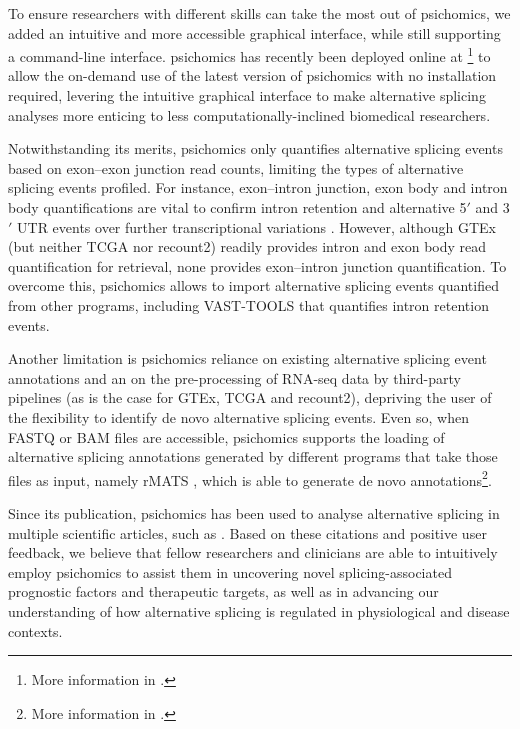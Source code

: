 To ensure researchers with different skills can take the most out of psichomics, we added an intuitive and more accessible graphical interface, while still supporting a command-line interface. psichomics has recently been deployed online at \footnote{More information in .} to allow the on-demand use of the latest version of psichomics with no installation required, levering the intuitive graphical interface to make alternative splicing analyses more enticing to less computationally-inclined biomedical researchers.

Notwithstanding its merits, psichomics only quantifies alternative splicing events based on exon–exon junction read counts, limiting the types of alternative splicing events profiled. For instance, exon–intron junction, exon body and intron body quantifications are vital to confirm intron retention and alternative 5$'$ and 3$'$ UTR events over further transcriptional variations \cite{braunschweig:2014tr}.
However, although GTEx (but neither TCGA nor recount2) readily provides intron and exon body read quantification for retrieval, none provides exon–intron junction quantification. To overcome this, psichomics allows to import alternative splicing events quantified from other programs, including VAST-TOOLS that quantifies intron retention events.

Another limitation is psichomics reliance on existing alternative splicing event annotations and an on the pre-processing of RNA-seq data by third-party pipelines (as is the case for GTEx, TCGA and recount2), depriving the user of the flexibility to identify de novo alternative splicing events. Even so, when FASTQ or BAM files are accessible, psichomics supports the loading of alternative splicing annotations generated by different programs that take those files as input, namely rMATS \cite{shen:2014tk}, which is able to generate de novo annotations\footnote{More information in .}.


Since its publication, psichomics has been used to analyse alternative splicing in multiple scientific articles, such as \cite{coomer:2019wz,baeza-centurion:2019tb,munkley:2019wr,baeza-centurion:2020vb}. Based on these citations and positive user feedback, we believe that fellow researchers and clinicians are able to intuitively employ psichomics to assist them in uncovering novel splicing-associated prognostic factors and therapeutic targets, as well as in advancing our understanding of how alternative splicing is regulated in physiological and disease contexts.
